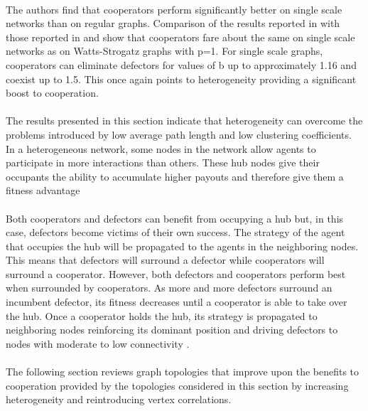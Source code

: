 \documentclass{article}
\begin{document}
	\paragraph{}The authors find that cooperators perform significantly better on single scale networks than on regular graphs.  Comparison of the results reported in \cite{Santos2006c} with those reported in \cite{Pacheco2005} and \cite{Santos2005a} show that cooperators fare about the same on single scale networks as on Watts-Strogatz graphs with p=1.  For single scale graphs, cooperators can eliminate defectors for values of b up to approximately 1.16 and coexist up to 1.5.  This once again points to heterogeneity providing a significant boost to cooperation.
	\paragraph{}The results presented in this section indicate that heterogeneity can overcome the problems introduced by low average path length and low clustering coefficients.  In a heterogeneous network, some nodes in the network allow agents to participate in more interactions than others.  These hub nodes give their occupants the ability to accumulate higher payouts and therefore give them a fitness advantage
	\paragraph{}Both cooperators and defectors can benefit from occupying a hub but, in this case, defectors become victims of their own success.  The strategy of the agent that occupies the hub will be propagated to the agents in the neighboring nodes.  This means that defectors will surround a defector while cooperators will surround a cooperator.  However, both defectors and cooperators perform best when surrounded by cooperators.  As more and more defectors surround an incumbent defector, its fitness decreases until a cooperator is able to take over the hub.  Once a cooperator holds the hub, its strategy is propagated to neighboring nodes reinforcing its dominant position and driving defectors to nodes with moderate to low connectivity \cite{Pacheco2005}\cite{Santos2006a}\cite{Santos2006b}.
	\newpage
	\paragraph{}The following section reviews graph topologies that improve upon the benefits to cooperation provided by the topologies considered in this section by increasing heterogeneity and reintroducing vertex correlations.
\end{document}
